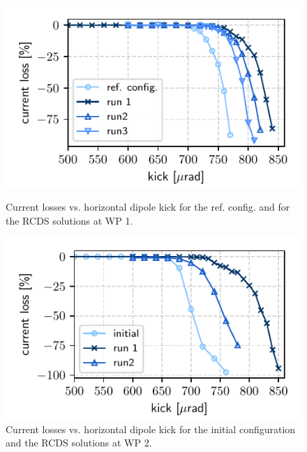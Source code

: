 \begin{figure}[!h]
    \begin{minipage}{0.48\textwidth}
        \includegraphics[width=\textwidth]{Images/WEPL087_f1.pdf}
       \caption{Current losses vs. horizontal dipole kick for the ref. config. and for the RCDS solutions at WP 1.}
       \label{fig:loss_kicks}
    \end{minipage}
    \hfill
    \begin{minipage}{0.48\textwidth}
        \includegraphics[width=\textwidth]{Images/WEPL087_f3.pdf}
        \caption{Current losses vs. horizontal dipole kick for the initial configuration and the RCDS solutions at WP 2.}
        \label{fig:loss_kicks_newtunes}
    \end{minipage}
\end{figure}


